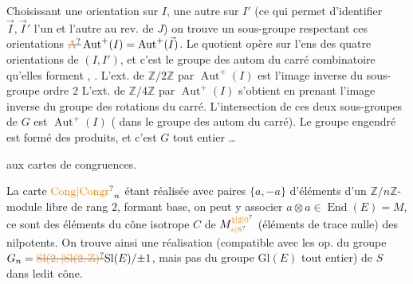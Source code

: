 Choisissant une orientation sur $I$, une autre
sur $I'$ (ce qui permet d'identifier $\vec I,\vec I'$ l'un
et l'autre au rev.  de $J$) on trouve
un sous-groupe respectant ces orientations
$\deleted{\unsure{\mathrm A}}\operatorname{Aut}^{+}(I)=\operatorname{Aut}^{+}(\vec I)$. Le quotient  opère
sur l'ens des quatre orientations de $(I,I')$, et 
c'est le groupe des autom du carré combinatoire
 qu'elles forment
, . L'ext. de $\mathbb Z/2\mathbb Z$ par $\operatorname{Aut}^+(I)$
est l'image inverse du sous-groupe 
ordre 2 
L'ext. de $\mathbb Z/4\mathbb Z$ par $\operatorname{Aut}^+(I)$ s'obtient en prenant
l'image inverse du groupe des rotations
du carré. L'intersection de ces deux
sous-groupes de $G$ est $\operatorname{Aut}^+(I)$
( dans le groupe des autom du
carré). Le groupe engendré est formé
des produits, et c'est $G$ tout entier \ldots

 aux cartes de congruences.

La carte $\unsure{\mathrm{Cong}|\mathrm{Congr}}_{n}$ étant réalisée avec 
 paires $\{a,-a\}$
d'éléments d'un $\mathbb Z/n\mathbb Z$-module libre  de
rang $2$, formant base, on peut y
associer $a\otimes a\in\operatorname{End}(E)=M$,  ce sont
des éléments du cône isotrope $C$ de $M^{\unsure{\natural|\sharp|0}}_{\unsure{s|8}}$
(éléments de trace nulle)   des
nilpotents. On trouve ainsi une réalisation
(compatible avec les op. du groupe
$G_n=\deleted{\unsure{\mathrm{Sl}(2,|\mathrm{Sl}(2,\mathbb Z)}}\mathrm{Sl}(E)/{\pm1}$, mais pas du groupe
$\mathrm{Gl}(E)$ tout entier) de $S$ dans ledit cône.

